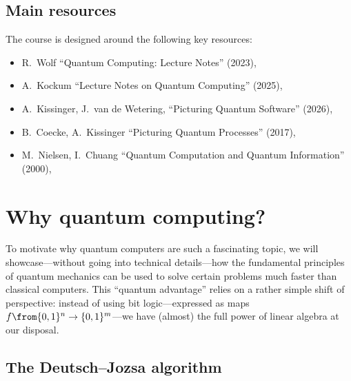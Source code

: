 \documentclass[a4paper,oneside, 12pt]{amsart}
\begin{document}
\subsection*{Main resources}\label{sec:main-resources}
The course is designed around the following key resources:

\begin{itemize}[leftmargin=*]
  \item  R.\ Wolf ``Quantum Computing: Lecture Notes'' (2023), \cite{wolf2023:QuantumComputing}
  \item A.\ Kockum \etal ``Lecture Notes on Quantum Computing'' (2025), \cite{kockum-soro-garcía-álvarez-et-al2025:Lecture}
  \item A.\ Kissinger, J.\ van de Wetering, ``Picturing Quantum Software'' (2026), \cite{kissinger-wetering2025:PicturingQuantumSoftware}
  \item B.\ Coecke, A.\ Kissinger ``Picturing Quantum Processes'' (2017), \cite{coecke-kissinger2017:PicturingQuantumProcesses}
  \item M.\ Nielsen, I.\ Chuang ``Quantum Computation and Quantum Information'' (2000), \cite{nielsen-chuang2000:QuantumComputationInformation}
\end{itemize}


\cleardoublepage

\section{Why quantum computing?}\label{sec:why-quantum-computing}

To motivate why quantum computers are such a fascinating topic, we will showcase---without going into technical details---how the fundamental principles of quantum mechanics can be used to solve certain problems much faster than classical computers.
This ``quantum advantage'' relies on a rather simple shift of perspective: instead of using bit logic---expressed as maps \(f\from \{0,1\}^{n}\to\{0,1\}^{m}\)---we have (almost) the full power of linear algebra at our disposal.

\subsection*{The Deutsch--Jozsa algorithm}\label{sec:the-deutsch--josza-algorithm}
\end{document}
